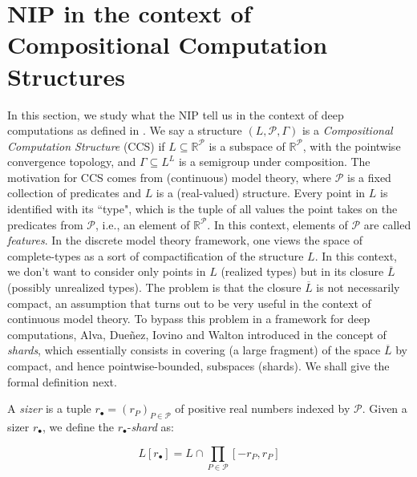 \documentclass[psamsfonts]{amsart}
\theoremstyle{definition}
\theoremstyle{remark}
\numberwithin{equation}{section}
\begin{document}
\section{NIP in the context of Compositional Computation Structures}

In this section, we study what the NIP tell us in the context of deep computations as defined in \cite{alva2024approximability}. We say a structure $(L,\mathcal P,\Gamma)$ is a \emph{Compositional Computation Structure} (CCS) if $L\subseteq\mathbb R^\mathcal P$ is a subspace of $\mathbb{R}^\mathcal{P}$, with the pointwise convergence topology, and $\Gamma\subseteq L^L$ is a semigroup under composition. The motivation for CCS comes from (continuous) model theory, where $\mathcal{P}$ is a fixed collection of predicates and $L$ is a (real-valued) structure. Every point in $L$ is identified with its ``type", which is the tuple of all values the point takes on the predicates from $\mathcal{P}$, i.e., an element of $\mathbb{R}^\mathcal{P}$. In this context, elements of $\mathcal{P}$ are called \emph{features}. In the discrete model theory framework, one views the space of complete-types as a sort of compactification of the structure $L$. In this context, we don't want to consider only points in $L$ (realized types) but in its closure $\overline{L}$ (possibly unrealized types). The problem is that the closure $\overline{L}$ is not necessarily compact, an assumption that turns out to be very useful in the context of continuous model theory. To bypass this problem in a framework for deep computations, Alva, Dueñez, Iovino and Walton introduced in \cite{alva2024approximability} the concept of \emph{shards}, which essentially consists in covering (a large fragment) of the space $\overline{L}$ by compact, and hence pointwise-bounded, subspaces (shards). We shall give the formal definition next.

A \emph{sizer} is a tuple $r_{\bullet}=(r_P)_{P\in\mathcal{P}}$ of positive real numbers indexed by $\mathcal{P}$. Given a sizer $r_\bullet$, we define the $r_\bullet$-\emph{shard} as:

$$L[r_\bullet]=L\cap\prod_{P\in\mathcal{P}}[-r_P,r_P]$$
\end{document}
